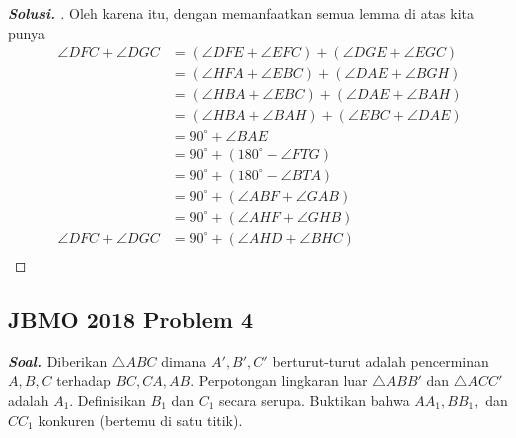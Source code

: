 \documentclass[letterpaper, 13pt]{scrartcl}
\begin{document}
\begin{proof}[\textbf{Solusi. }]
    Oleh karena itu, dengan memanfaatkan semua lemma di atas kita punya
    \begin{align*}
        \angle DFC + \angle DGC &= (\angle DFE + \angle EFC) + (\angle DGE + \angle EGC)\\
        &= (\angle HFA + \angle EBC) + (\angle DAE + \angle BGH)\\
        &= (\angle HBA + \angle EBC) + (\angle DAE + \angle BAH)\\
        &= (\angle HBA + \angle BAH) + (\angle EBC + \angle DAE)\\
        &= 90^\circ + \angle BAE\\
        &= 90^\circ + (180^\circ - \angle FTG)\\
        &= 90^\circ + (180^\circ - \angle BTA)\\
        &= 90^\circ + (\angle ABF + \angle GAB)\\
        &= 90^\circ + (\angle AHF + \angle GHB)\\ 
        \angle DFC + \angle DGC &= 90^\circ + (\angle AHD + \angle BHC)\\ 
    \end{align*}
\end{proof}

\subsection{JBMO 2018 Problem 4}

\textbf{\textit{Soal. }}Diberikan $\triangle ABC$ dimana $A',B',C'$ berturut-turut adalah pencerminan $A,B,C$ terhadap $BC,CA,AB$. Perpotongan lingkaran luar $\triangle ABB'$ dan $\triangle ACC'$ adalah $A_1$. Definisikan $B_1$ dan $C_1$ secara serupa. Buktikan bahwa $AA_1,BB_1,$ dan $CC_1$ konkuren (bertemu di satu titik).
\end{document}
